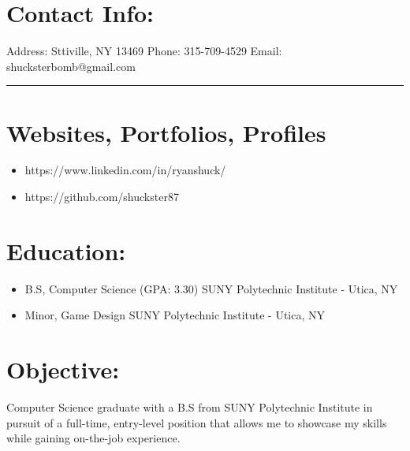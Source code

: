 \documentclass[12pt, oneside, a4paper]{article}
\begin{document}
  

    \section*{Contact Info:}
    Address: Sttiville, NY 13469
    \newline
    Phone: 315-709-4529
    \newline
    Email: shucksterbomb@gmail.com
    \newline

    \noindent
    {\color{blue} \rule{\linewidth}{1mm}}

    \section*{Websites, Portfolios, Profiles}
    \begin{itemize}
        \item https://www.linkedin.com/in/ryanshuck/
        \item https://github.com/shuckster87
    \end{itemize}

    \section*{Education:}
    \begin{itemize}
    \item B.S, Computer Science  (GPA: 3.30)
    SUNY Polytechnic Institute - Utica, NY
    \item Minor, Game Design
    SUNY Polytechnic Institute - Utica, NY
    \end{itemize}

    \section*{Objective:}
    Computer Science graduate with a B.S from SUNY Polytechnic Institute in pursuit of a full-time, entry-level position that allows me to showcase my skills while gaining on-the-job experience.
\end{document}
